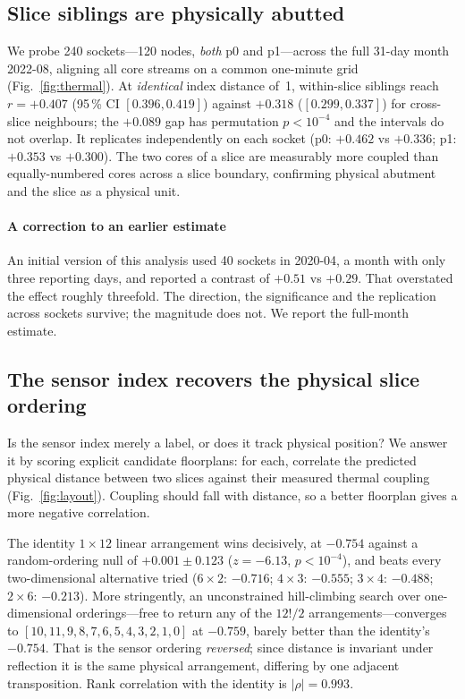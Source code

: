 \documentclass[10pt,conference]{IEEEtran}
\begin{document}
\subsection{Slice siblings are physically abutted}
We probe 240 sockets---120 nodes, \emph{both} p0 and p1---across the full 31-day month 2022-08,
aligning all core streams on a common one-minute grid (Fig.~\ref{fig:thermal}). At
\emph{identical} index distance of~1, within-slice siblings reach $r=+0.407$
(95\,\% CI $[0.396,0.419]$) against $+0.318$ ($[0.299,0.337]$) for cross-slice neighbours;
the $+0.089$ gap has permutation $p<10^{-4}$ and the intervals do not overlap. It replicates
independently on each socket (p0: $+0.462$ vs $+0.336$; p1: $+0.353$ vs $+0.300$). The two cores of
a slice are measurably more coupled than equally-numbered cores across a slice boundary, confirming
physical abutment and the slice as a physical unit.

\paragraph*{A correction to an earlier estimate} An initial version of this analysis used 40
sockets in 2020-04, a month with only three reporting days, and reported a contrast of
$+0.51$ vs $+0.29$. That overstated the effect roughly threefold. The direction, the significance
and the replication across sockets survive; the magnitude does not. We report the full-month
estimate.

\subsection{The sensor index recovers the physical slice ordering}
\label{sec:layout}
Is the sensor index merely a label, or does it track physical position? We answer it by scoring
explicit candidate floorplans: for each, correlate the predicted physical distance between two
slices against their measured thermal coupling (Fig.~\ref{fig:layout}). Coupling should fall with
distance, so a better floorplan gives a more negative correlation.

The identity $1\times12$ linear arrangement wins decisively, at $-0.754$ against a
random-ordering null of $+0.001\pm0.123$ ($z=-6.13$, $p<10^{-4}$), and beats every two-dimensional
alternative tried ($6\times2$: $-0.716$; $4\times3$: $-0.555$; $3\times4$: $-0.488$; $2\times6$:
$-0.213$). More stringently, an unconstrained hill-climbing search over one-dimensional
orderings---free to return any of the $12!/2$ arrangements---converges to
$[10,11,9,8,7,6,5,4,3,2,1,0]$ at $-0.759$, barely better than the identity's $-0.754$. That is the
sensor ordering \emph{reversed}; since distance is invariant under reflection it is the same
physical arrangement, differing by one adjacent transposition. Rank correlation with the identity
is $|\rho|=0.993$.
\end{document}
